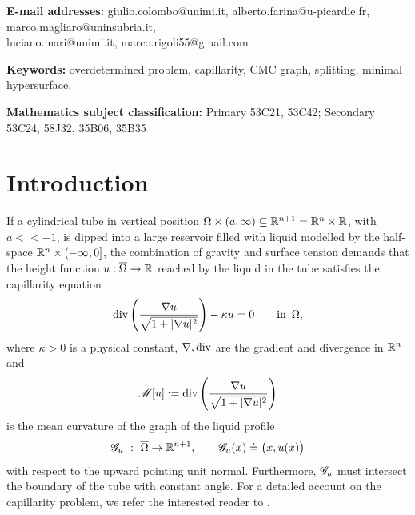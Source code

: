 \documentclass[10 pt,a4paper]{article}
\theoremstyle{definition}
\begin{document}
\bigskip

\noindent \textbf{E-mail addresses:}  giulio.colombo@unimi.it, alberto.farina@u-picardie.fr, marco.magliaro@uninsubria.it,\\
luciano.mari@unimi.it, marco.rigoli55@gmail.com

\vspace{0.2cm}

\noindent\textbf{Keywords:} overdetermined problem, capillarity, CMC graph, splitting, minimal hypersurface.

\vspace{0.2cm}

\noindent \textbf{Mathematics subject classification:} Primary 53C21, 53C42; Secondary 53C24, 58J32, %
35B06, 35B35


\normalsize
%
%
%

\begin{abstract}
	We prove some rigidity and classification results for graphs with prescribed mean curvature and locally constant Dirichlet and Neumann data, for instance as they appear in capillarity problems. We consider domains in Riemannian manifolds, with emphasis on $\R^2$ and $\R^3$. We classify both the underlying domain and the resulting solution, providing general splitting theorems in this setting. 	
\end{abstract}	

\tableofcontents

\section{Introduction}

If a cylindrical tube in vertical position $\Omega \times (a,\infty) \subseteq \mathbb R^{n+1} = \mathbb R^n \times \mathbb R$, with $a<<-1$, is dipped into a large reservoir filled with liquid modelled by the half-space $\mathbb R^n \times (-\infty,0]$, the combination of gravity and surface tension demands that the height function $u : \overline\Omega \to \mathbb R$ reached by the liquid in the tube satisfies the capillarity equation
\[
	\mathrm{div} \left( \dfrac{\nabla u}{\sqrt{1+|\nabla u|^2}} \right) - \kappa u = 0 \qquad \text{in } \, \Omega,
\]
where $\kappa > 0$ is a physical constant, $\nabla, \mathrm{div}$ are the gradient and divergence in $\mathbb R^n$ and 
\[
	\mathscr{M}[u] : = \mathrm{div} \left( \dfrac{\nabla u}{\sqrt{1+|\nabla u|^2}} \right)
\]
is the mean curvature of the graph of the liquid profile
\[
	\GG_u \ : \ \overline\Omega \to \R^{n+1}, \qquad \GG_u(x) \doteq \big(x, u(x)\big)
\]
with respect to the upward pointing unit normal. Furthermore, $\mathscr{G}_u$ must intersect the boundary of the tube with constant angle. For a detailed account on the capillarity problem, we refer the interested reader to \cite{finn}.
\end{document}
